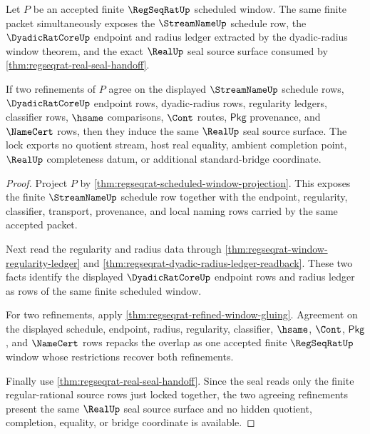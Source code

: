 \begin{theorem}
\label{thm:regseqrat-streamname-dyadic-window-lock}
Let $P$ be an accepted finite $\RegSeqRatUp$ scheduled window. The same finite packet simultaneously exposes the $\StreamNameUp$ schedule row, the $\DyadicRatCoreUp$ endpoint and radius ledger extracted by the dyadic-radius window theorem, and the exact $\RealUp$ seal source surface consumed by \autoref{thm:regseqrat-real-seal-handoff}.

If two refinements of $P$ agree on the displayed $\StreamNameUp$ schedule rows, $\DyadicRatCoreUp$ endpoint rows, dyadic-radius rows, regularity ledgers, classifier rows, $\hsame$ comparisons, $\Cont$ routes, $\mathsf{Pkg}$ provenance, and $\NameCert$ rows, then they induce the same $\RealUp$ seal source surface. The lock exports no quotient stream, host real equality, ambient completion point, $\RealUp$ completeness datum, or additional standard-bridge coordinate.
\end{theorem}
\begin{proof}
Project $P$ by \autoref{thm:regseqrat-scheduled-window-projection}. This exposes the finite $\StreamNameUp$ schedule row together with the endpoint, regularity, classifier, transport, provenance, and local naming rows carried by the same accepted packet.

Next read the regularity and radius data through \autoref{thm:regseqrat-window-regularity-ledger} and \autoref{thm:regseqrat-dyadic-radius-ledger-readback}. These two facts identify the displayed $\DyadicRatCoreUp$ endpoint rows and radius ledger as rows of the same finite scheduled window.

For two refinements, apply \autoref{thm:regseqrat-refined-window-gluing}. Agreement on the displayed schedule, endpoint, radius, regularity, classifier, $\hsame$, $\Cont$, $\mathsf{Pkg}$, and $\NameCert$ rows repacks the overlap as one accepted finite $\RegSeqRatUp$ window whose restrictions recover both refinements.

Finally use \autoref{thm:regseqrat-real-seal-handoff}. Since the seal reads only the finite regular-rational source rows just locked together, the two agreeing refinements present the same $\RealUp$ seal source surface and no hidden quotient, completion, equality, or bridge coordinate is available.
\end{proof}

